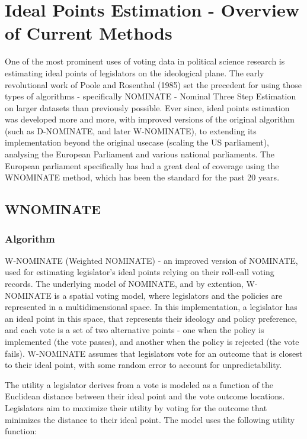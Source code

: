 \documentclass{report}
\begin{document}
    \chapter{Ideal Points Estimation - Overview of Current Methods}
        One of the most prominent uses of voting data in political science research is estimating ideal points of
        legislators on the ideological plane. The early revolutional work of Poole and Rosenthal (1985) set the
        precedent for using those types of algorithms - specifically NOMINATE - Nominal Three Step Estimation on
        larger datasets than previously possible. Ever since, ideal points estimation was developed more and more,
        with improved versions of the original algorithm (such as D-NOMINATE, and later W-NOMINATE), to extending
        its implementation beyond the original usecase (scaling the US parliament), analysing the European
        Parliament and various national parliaments. The European parliament specifically has had a great deal of
        coverage using the WNOMINATE method, which has been the standard for the past 20 years.


        \section{WNOMINATE}

            \subsection{Algorithm}

                W-NOMINATE (Weighted NOMINATE) - an improved version of NOMINATE, used for estimating legislator's
                ideal points relying on their roll-call voting records. The underlying model of NOMINATE, and by
                extention, W-NOMINATE is a spatial voting model, where legislators and the policies are represented
                in a multidimensional space. In this implementation, a legislator has an ideal point in this space,
                that represents their ideology and policy preference, and each vote is a set of two alternative
                points - one when the policy is implemented (the vote passes), and another when the policy is
                rejected (the vote fails). W-NOMINATE assumes that legislators vote for an outcome that is closest
                to their ideal point, with some random error to account for unpredictability.

                The utility a legislator derives from a vote is modeled as a function of the Euclidean distance between
                their ideal point and the vote outcome locations. Legislators aim to maximize their utility by voting
                for the outcome that minimizes the distance to their ideal point. The model uses the following utility
                function:
\end{document}
